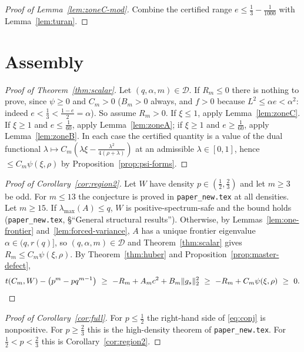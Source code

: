 \documentclass[11pt]{article}
\begin{document}
\begin{proof}[Proof of Lemma~\ref{lem:zoneC-mod}]
Combine the certified range $e\le\tfrac13-\tfrac1{1000}$ with
Lemma~\ref{lem:turan}.
\end{proof}

\section{Assembly}\label{sec:assembly}

\begin{proof}[Proof of Theorem~\ref{thm:scalar}]
Let $(q,\alpha,m)\in\mathcal D$.  If $R_m\le0$ there is nothing to prove, since
$\psi\ge0$ and $C_m>0$ ($B_m>0$ always, and $f>0$ because
$L^2\le\alpha e<\alpha^2$: indeed $e<\tfrac13<\tfrac{1-e}2=\alpha$).
So assume $R_m>0$.  If $\xi\le1$, apply
Lemma~\ref{lem:zoneC}.  If $\xi\ge1$ and $e\le\tfrac1{60}$, apply
Lemma~\ref{lem:zoneA}; if $\xi\ge1$ and $e\ge\tfrac1{60}$, apply
Lemma~\ref{lem:zoneB}.  In each case the certified quantity is a value of the
dual functional $\lambda\mapsto C_m(\lambda\xi-\frac{\lambda^2}{4(\rho+\lambda)})$
at an admissible $\lambda\in[0,1]$, hence $\le C_m\psi(\xi,\rho)$ by
Proposition~\ref{prop:psi-forms}.
\end{proof}

\begin{proof}[Proof of Corollary~\ref{cor:region2}]
Let $W$ have density $p\in(\tfrac12,\tfrac23)$ and let $m\ge3$ be odd.  For
$m\le13$ the conjecture is proved in \texttt{paper\_new.tex} at all densities.
Let $m\ge15$.  If $\lambda_{\max}(A)\le q$, $W$ is positive-spectrum-safe and
the bound holds (\texttt{paper\_new.tex}, \S ``General structural results'').
Otherwise, by Lemmas~\ref{lem:one-frontier} and~\ref{lem:forced-variance}, $A$
has a unique frontier eigenvalue $\alpha\in(q,r(q)]$, so $(q,\alpha,m)\in\mathcal D$
and Theorem~\ref{thm:scalar} gives $R_m\le C_m\psi(\xi,\rho)$.  By
Theorem~\ref{thm:huber} and Proposition~\ref{prop:master-defect},
\[
        t(C_m,W)-\bigl(p^m-pq^{m-1}\bigr)
        \ \ge\ -R_m+A_mc^2+B_m\|g_s\|_2^2
        \ \ge\ -R_m+C_m\psi(\xi,\rho)\ \ge\ 0. \qedhere
\]
\end{proof}

\begin{proof}[Proof of Corollary~\ref{cor:full}]
For $p\le\tfrac12$ the right-hand side of \eqref{eq:conj} is nonpositive.  For
$p\ge\tfrac23$ this is the high-density theorem of \texttt{paper\_new.tex}.
For $\tfrac12<p<\tfrac23$ this is Corollary~\ref{cor:region2}.
\end{proof}
\end{document}
